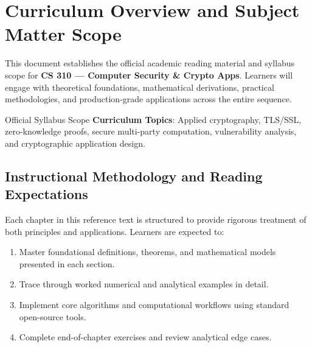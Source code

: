 \section{Curriculum Overview and Subject Matter Scope}

This document establishes the official academic reading material and syllabus scope for \textbf{CS 310 --- Computer Security \& Crypto Apps}. Learners will engage with theoretical foundations, mathematical derivations, practical methodologies, and production-grade applications across the entire sequence.

\begin{InsightBox}{Official Syllabus Scope}
  \textbf{Curriculum Topics}: Applied cryptography, TLS/SSL, zero-knowledge proofs, secure multi-party computation, vulnerability analysis, and cryptographic application design.
\end{InsightBox}

\subsection{Instructional Methodology and Reading Expectations}

Each chapter in this reference text is structured to provide rigorous treatment of both principles and applications. Learners are expected to:
\begin{enumerate}
  \item Master foundational definitions, theorems, and mathematical models presented in each section.
  \item Trace through worked numerical and analytical examples in detail.
  \item Implement core algorithms and computational workflows using standard open-source tools.
  \item Complete end-of-chapter exercises and review analytical edge cases.
\end{enumerate}

